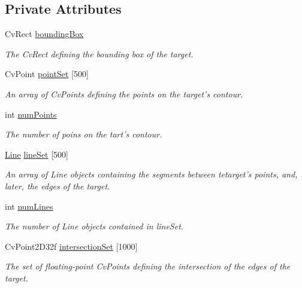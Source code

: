 \subsection*{Private Attributes}
\begin{DoxyCompactItemize}
\item 
CvRect \hyperlink{classTarget_ab883696aeef59f629cd850e0bb3c15e2}{boundingBox}
\begin{DoxyCompactList}\small\item\em The CvRect defining the bounding box of the target. \item\end{DoxyCompactList}\item 
CvPoint \hyperlink{classTarget_a8cdd69bb1321e6928fcdfaf6959e5fe2}{pointSet} \mbox{[}500\mbox{]}
\begin{DoxyCompactList}\small\item\em An array of CvPoints defining the points on the target's contour. \item\end{DoxyCompactList}\item 
int \hyperlink{classTarget_af7e7aa3898edd34429c99d391e7fe995}{numPoints}
\begin{DoxyCompactList}\small\item\em The number of poins on the tart's contour. \item\end{DoxyCompactList}\item 
\hyperlink{classLines_1_1Line}{Line} \hyperlink{classTarget_af112a6c4b4cb598d27f33332de574680}{lineSet} \mbox{[}500\mbox{]}
\begin{DoxyCompactList}\small\item\em An array of Line objects containing the segments between tetarget's points, and, later, the edges of the target. \item\end{DoxyCompactList}\item 
int \hyperlink{classTarget_ae66edfe3234fad4f2e46c2975b29ab89}{numLines}
\begin{DoxyCompactList}\small\item\em The number of Line objects contained in lineSet. \item\end{DoxyCompactList}\item 
CvPoint2D32f \hyperlink{classTarget_a26d36f01443f1f26da59e18ad4552a4f}{intersectionSet} \mbox{[}1000\mbox{]}
\begin{DoxyCompactList}\small\item\em The set of floating-\/point CvPoints defining the intersection of the edges of the target. \item\end{DoxyCompactList}\item 

\end{DoxyCompactItemize}
